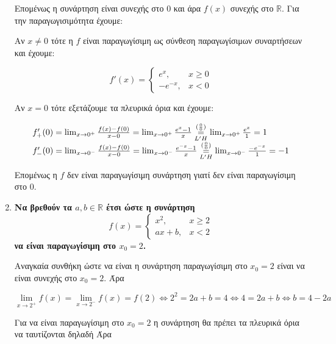 \begin{enumerate}
		Επομένως η συνάρτηση είναι συνεχής στο 0 και άρα $ f(x) $ συνεχής στο $
		\mathbb{R} $.
		Για την παραγωγισιμότητα έχουμε:

		Αν $ x \neq 0 $ τότε η $f$ είναι παραγωγίσιμη ως σύνθεση παραγωγίσιμων
		συναρτήσεων και έχουμε:

		\[
			f'(x) = \begin{cases}
				e^{x}, & x\geq 0 \\
				-e^{-x}, & x < 0
			\end{cases}
		\]

		Αν $ x = 0 $ τότε εξετάζουμε τα πλευρικά όρια και έχουμε:

		\[
			\begin{tabular}{l}
			$f_{+}'(0) = \lim_{x\to 0^{+}} \frac{f(x) - f(0)}{x - 0} = \lim_{x \to
				0^{+}} \frac{e^{x} - 1}{x}
				\overset{(\frac{0}{0})}{\underset{L'H}{=}} \lim_{x\to 0^{+}}
			\frac{e^{x}}{1} = 1 $ \\
			$f_{-}'(0) = \lim_{x\to 0^{-}} \frac{f(x) - f(0)}{x - 0} =
			\lim_{x\to 0^{-}} \frac{e^{-x} - 1}{x} \overset{(\frac{0}{0})}{\underset{L'H}{=}}
			\lim_{x\to 0^{-}}
			\frac{-e^{-x}}{1} = -1 $
			\end{tabular}
		\]
		
		Επομένως η $f$ δεν είναι παραγωγίσιμη συνάρτηση γιατί δεν είναι
		παραγωγίσιμη στο 0.



	\item {\bfseries \boldmath Να βρεθούν τα $ a, b \in \mathbb{R} $ έτσι ώστε η συνάρτηση 
		\[
			f(x) = \begin{cases}
				x^{2}, & x\geq 2 \\
				ax+b , & x<2
			\end{cases}
		\]
	να είναι παραγωγίσιμη στο $ x_{0} = 2 $.}


		
		Αναγκαία συνθήκη ώστε να είναι η συνάρτηση παραγωγίσιμη στο $ x_{0} = 2
		$ είναι να είναι συνεχής στο $ x_{0} = 2 $. Άρα

		\begin{equation}\label{eq:cont}
			\lim_{x\to 2^{+}} f(x) = \lim_{x\to 2^{-}} f(x) = f(2)
			\Leftrightarrow 2^{2} = 2a + b = 4 \Leftrightarrow 4 = 2a + b
			\Leftrightarrow b = 4 - 2a
		\end{equation}
		
		Για να είναι παραγωγίσιμη στο $ x_{0} = 2 $ η συνάρτηση θα πρέπει τα
		πλευρικά όρια να ταυτίζονται δηλαδή  Άρα


\end{enumerate}

